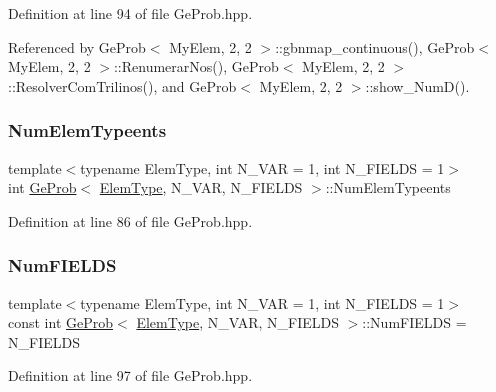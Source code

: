 Definition at line 94 of file Ge\+Prob.\+hpp.



Referenced by Ge\+Prob$<$ My\+Elem, 2, 2 $>$\+::gbnmap\+\_\+continuous(), Ge\+Prob$<$ My\+Elem, 2, 2 $>$\+::\+Renumerar\+Nos(), Ge\+Prob$<$ My\+Elem, 2, 2 $>$\+::\+Resolver\+Com\+Trilinos(), and Ge\+Prob$<$ My\+Elem, 2, 2 $>$\+::show\+\_\+\+Num\+D().

\mbox{\label{classGeProb_a1555edf9114f6b65ef9a7820dfc16e63}} 
\subsubsection{\texorpdfstring{Num\+Elem\+Typeents}{NumElemTypeents}}
{\footnotesize\ttfamily template$<$typename Elem\+Type, int N\+\_\+\+V\+AR = 1, int N\+\_\+\+F\+I\+E\+L\+DS = 1$>$ \\
int \hyperlink{classGeProb}{Ge\+Prob}$<$ \hyperlink{spectral_8h_aaa2c1a7b2d1b12c590d730fe6ac839fa}{Elem\+Type}, N\+\_\+\+V\+AR, N\+\_\+\+F\+I\+E\+L\+DS $>$\+::Num\+Elem\+Typeents\hspace{0.3cm}{\ttfamily [protected]}}



Definition at line 86 of file Ge\+Prob.\+hpp.

\mbox{\label{classGeProb_adede55ee31a140d1cd8a9076ecdc41e1}} 
\subsubsection{\texorpdfstring{Num\+F\+I\+E\+L\+DS}{NumFIELDS}}
{\footnotesize\ttfamily template$<$typename Elem\+Type, int N\+\_\+\+V\+AR = 1, int N\+\_\+\+F\+I\+E\+L\+DS = 1$>$ \\
const int \hyperlink{classGeProb}{Ge\+Prob}$<$ \hyperlink{spectral_8h_aaa2c1a7b2d1b12c590d730fe6ac839fa}{Elem\+Type}, N\+\_\+\+V\+AR, N\+\_\+\+F\+I\+E\+L\+DS $>$\+::Num\+F\+I\+E\+L\+DS = N\+\_\+\+F\+I\+E\+L\+DS\hspace{0.3cm}{\ttfamily [protected]}}



Definition at line 97 of file Ge\+Prob.\+hpp.

\mbox{\label{classGeProb_af87232ea7d32eff7618f97a9792b3761}} 
